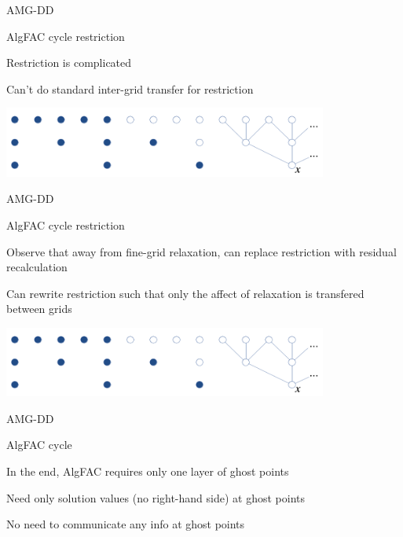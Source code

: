 \documentclass[18pt,xcolor=table]{beamer}
\begin{document}
\begin{frame}{AMG-DD}
\begin{block}{AlgFAC cycle restriction}
\bit
\item Restriction is complicated
\item Can't do standard inter-grid transfer for restriction
\eit
\end{block}
\centering
\includegraphics[width=0.8\textwidth]{../figures/restrictionStencils}
\end{frame}

\begin{frame}{AMG-DD}
\begin{block}{AlgFAC cycle restriction}
\bit
\item Observe that away from fine-grid relaxation, can replace restriction with residual recalculation
\item Can rewrite restriction such that only the affect of relaxation is transfered between grids
\eit
\end{block}
\centering
\includegraphics[width=0.8\textwidth]{../figures/restrictionStencils}
\end{frame}

\begin{frame}{AMG-DD}
\begin{block}{AlgFAC cycle}
\bit
\item In the end, AlgFAC requires only one layer of ghost points
\item Need only solution values (no right-hand side) at ghost points
\item No need to communicate any info at ghost points
\eit
\end{block}
\end{frame}
\end{document}
